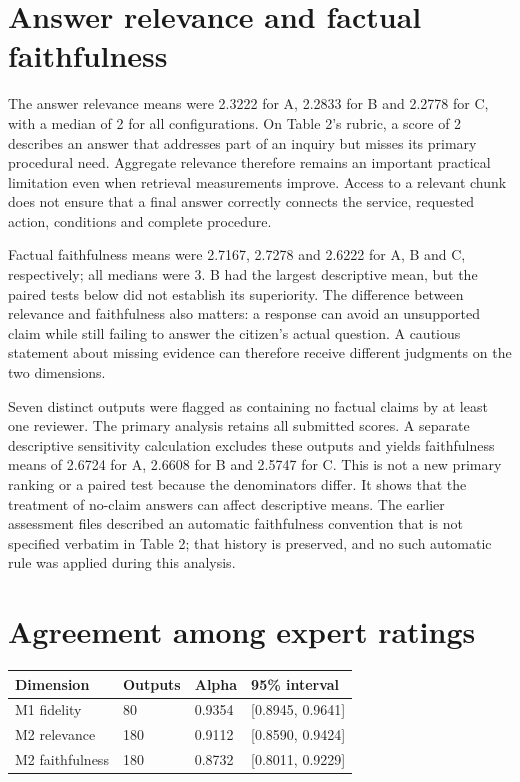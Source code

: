 \section{Answer relevance and factual faithfulness}

The answer relevance means were 2.3222 for A, 2.2833 for B and 2.2778 for C, with a median of 2 for all configurations. On Table 2's rubric, a score of 2 describes an answer that addresses part of an inquiry but misses its primary procedural need. Aggregate relevance therefore remains an important practical limitation even when retrieval measurements improve. Access to a relevant chunk does not ensure that a final answer correctly connects the service, requested action, conditions and complete procedure.


Factual faithfulness means were 2.7167, 2.7278 and 2.6222 for A, B and C, respectively; all medians were 3. B had the largest descriptive mean, but the paired tests below did not establish its superiority. The difference between relevance and faithfulness also matters: a response can avoid an unsupported claim while still failing to answer the citizen's actual question. A cautious statement about missing evidence can therefore receive different judgments on the two dimensions.


Seven distinct outputs were flagged as containing no factual claims by at least one reviewer. The primary analysis retains all submitted scores. A separate descriptive sensitivity calculation excludes these outputs and yields faithfulness means of 2.6724 for A, 2.6608 for B and 2.5747 for C. This is not a new primary ranking or a paired test because the denominators differ. It shows that the treatment of no-claim answers can affect descriptive means. The earlier assessment files described an automatic faithfulness convention that is not specified verbatim in Table 2; that history is preserved, and no such automatic rule was applied during this analysis.


\section{Agreement among expert ratings}

{\small\begin{longtable}{@{}p{1.505in}p{1.505in}p{1.505in}p{1.505in}@{}}\toprule

Dimension & Outputs & Alpha & 95\% interval \\ \midrule\endhead

M1 fidelity & 80 & 0.9354 & [0.8945, 0.9641] \\

M2 relevance & 180 & 0.9112 & [0.8590, 0.9424] \\

M2 faithfulness & 180 & 0.8732 & [0.8011, 0.9229] \\

\bottomrule\end{longtable}}

